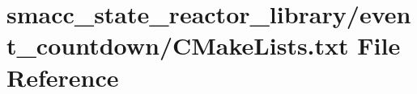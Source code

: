 \hypertarget{state__reactor__library_2event__countdown_2CMakeLists_8txt}{}\section{smacc\+\_\+state\+\_\+reactor\+\_\+library/event\+\_\+countdown/\+C\+Make\+Lists.txt File Reference}
\label{state__reactor__library_2event__countdown_2CMakeLists_8txt}
